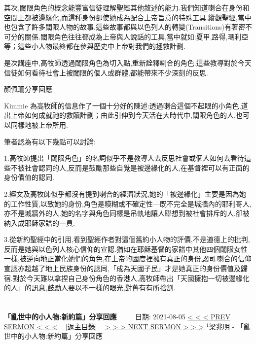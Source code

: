 \documentclass{book}
\begin{document}
其次,閾限角色的概念能豐富信徒理解聖經其他敘述的能力.我們知道喇合在身份和空間上都被邊緣化,而這種身份卻使她成為配合上帝旨意的特殊工具.縱觀聖經,當中也包含了許多閾限人物的故事.這些故事都與以色列人的轉變(Transitions)有著密不可分的關係.閾限角色往往都成為上帝與人說話的工具,當中就如:夏甲,路得,瑪利亞等；這些小人物最終都在參與歷史中上帝對我們的拯救計劃.

是次講座中,高牧師透過閾限角色為切入點,重新詮釋喇合的角色.這些教導對於今天信徒如何看待社會上被閾限的個人或群體,都能帶來不少深刻的反思.

顏佩珊分享回應

Kimmie 為高牧師的信息作了一個十分好的陳述:透過喇合這個不起眼的小角色,道出上帝如何成就祂的救贖計劃；由此引伸到今天活在大時代中,閾限角色的人,也可以同樣地被上帝所用.

筆者認為有以下幾點可以討論:

1.高牧師提出「閾限角色」的名詞似乎不是教導人去反思社會或個人如何去看待這些不被社會認同的人,反而是鼓勵那些自覺是被邊緣化的人,在基督裡可以有正面的身份價值的認同.

2.經文及高牧師似乎都沒有提到喇合的經濟狀況,她的「被邊緣化」主要是因為她的工作性質,以致她的身份,角色是糢糊或不確定性—既不完全是城牆內的耶利哥人,亦不是城牆外的人.她的名字與角色同樣是吊軌地讓人聯想到被社會排斥的人,卻被納入成耶穌家譜的一員.

3.從新約聖經中的引用,看到聖經作者對這個舊約小人物的評價,不是道德上的批判,反而是她與以色列人核心信仰的宣認.猶如在耶穌基督的家譜中其他四個閾限女性一樣,被逆向地正當化她們的角色,在上帝的國度裡擁有真正的身份認同.喇合的信仰宣認亦超越了地上民族身份的認同,「成為天國子民」才是她真正的身份價值及歸宿.對於今天難以拿捏自己身份角色的香港人,高牧師帶出「天國擁抱一切被邊緣化的人」的訊息,鼓勵人要以不一樣的眼光,對舊有有所捨割.
\newpage



\section{}
\label{sec:4}
\textbf{「亂世中的小人物:新約篇」分享回應}
\newline
\newline
~~~~ 日期: 2021-08-05
\newline
\newline
\hyperref[sec:3]{\small{< < < PREV SERMON < < <}}
~
\hyperref[sec:index]{\small{[返主目錄]}}
~
\hyperref[sec:5]{\small{> > > NEXT SERMON > > >}}
\newline
\newline
$^{1}$梁兆明 - 「亂世中的小人物:新約篇」分享回應
\end{document}
